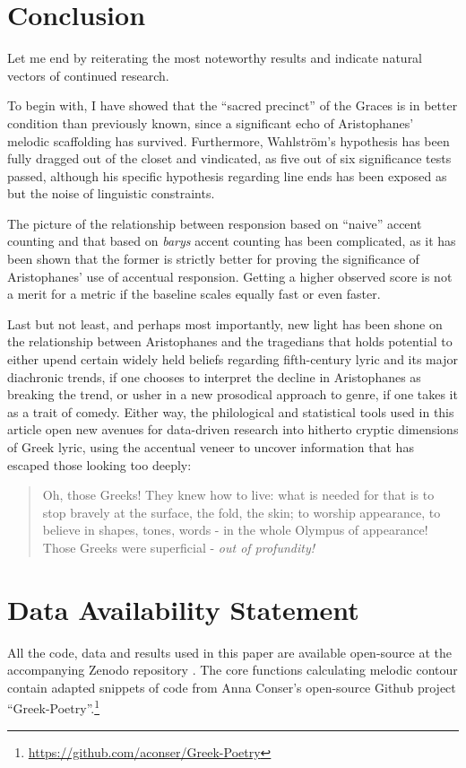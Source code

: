\documentclass[twoside]{article}
\begin{document}
\section{Conclusion}

Let me end by reiterating the most noteworthy results and indicate natural vectors of continued research. 

To begin with, I have showed that the ``sacred precinct'' of the Graces is in better condition than previously known, since a significant echo of Aristophanes' melodic scaffolding has survived. Furthermore, Wahlström's hypothesis has been fully dragged out of the closet and vindicated, as five out of six significance tests passed, although his specific hypothesis regarding line ends has been exposed as but the noise of linguistic constraints.

The picture of the relationship between responsion based on ``naive'' accent counting and that based on \textit{barys} accent counting has been complicated, as it has been shown that the former is strictly better for proving the significance of Aristophanes' use of accentual responsion. Getting a higher observed score is not a merit for a metric if the baseline scales equally fast or even faster.

Last but not least, and perhaps most importantly, new light has been shone on the relationship between Aristophanes and the tragedians that holds potential to either upend certain widely held beliefs regarding fifth-century lyric and its major diachronic trends, if one chooses to interpret the decline in Aristophanes as breaking the trend, or usher in a new prosodical approach to genre, if one takes it as a trait of comedy. Either way, the philological and statistical tools used in this article open new avenues for data-driven research into hitherto cryptic dimensions of Greek lyric, using the accentual veneer to uncover information that has escaped those looking too deeply:

\begin{quote}
Oh, those Greeks! They knew how to live: what is needed for that is to stop bravely at the surface, the fold, the skin; to worship appearance, to believe in shapes, tones, words - in the whole Olympus of appearance! Those Greeks were superficial - \textit{out of profundity!} \parencite[8]{nietzscheGaySciencePrelude2004}
\end{quote}

\section*{Data Availability Statement}
All the code, data and results used in this paper are available open-source at the accompanying Zenodo repository \textcite{albinthornclelandUrdatornAristophaniscanticaArticle2026}. The core functions calculating melodic contour contain adapted snippets of code from Anna Conser’s open-source Github project ``Greek-Poetry''.\footnote{\url{https://github.com/aconser/Greek-Poetry}}
\end{document}
